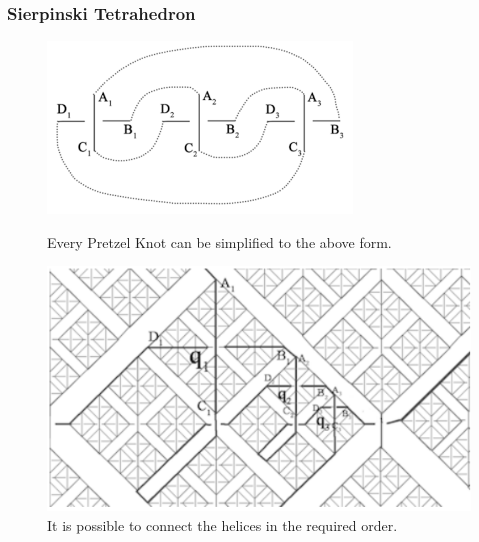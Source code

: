 \begin{frame}
	\frametitle{Sierpinski Tetrahedron}
	\begin{figure}[!htb]
		\begin{minipage}{0.4\textwidth}
			\centering
			\includegraphics[width=1.0\linewidth]{images/SimplifiedPretzelKnot}
			\caption{Every Pretzel Knot can be simplified to the above form. \cite{broden2024knotsinsidefractals}}\label{Fig:SimplifiedPretzelKnot}
		\end{minipage}\hfill
		\begin{minipage}{0.6\textwidth}
			\centering
			\includegraphics[width=1.0\linewidth]{images/ConnectHelices}
			\caption{It is possible to connect the helices in the required order. \cite{broden2024knotsinsidefractals}}\label{Fig:ConnectHelices}
		\end{minipage}
	\end{figure}
\end{frame}

